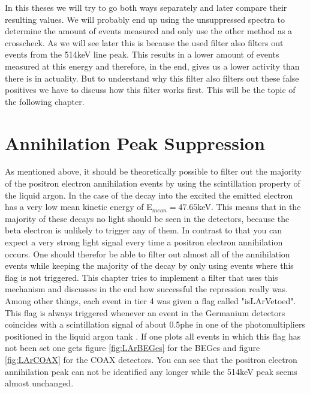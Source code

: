 In this theses we will try to go both ways separately and later compare their resulting values.
We will probably end up using the unsuppressed spectra to determine the amount of events measured and only use the other method as a crosscheck.
As we will see later this is because the used filter also filters out events from the 514keV line peak.
This results in a lower amount of events measured at this energy and therefore, in the end, gives us a lower activity than there is in actuality. 
But to understand why this filter also filters out these false positives we have to discuss how this filter works first.
This will be the topic of the following chapter.
\\

\section{Annihilation Peak Suppression}
\label{sec:APS}

As mentioned above, it should be theoretically possible to filter out the majority of the positron electron annihilation events by using the scintillation property of the liquid argon.
In the case of the \Kr decay into the excited  the emitted electron has a very low mean kinetic energy of E\(_{mean}=47.65\)keV.
This means that in the majority of these decays no light should be seen in the detectors, because the beta electron is unlikely to trigger any of them.
In contrast to that you can expect a very strong light signal every time a positron electron annihilation occurs. 
One should therefor be able to filter out almost all of the annihilation events while keeping the majority of the \Kr decay by only using events where this flag is not triggered.
This chapter tries to implement a filter that uses this mechanism and discusses in the end how successful the repression really was.
\\

Among other things, each event in tier 4 was given a flag called "isLArVetoed".
This flag is always triggered whenever an event in the Germanium detectors coincides with a scintillation signal of about 0.5phe in one of the photomultipliers positioned in the liquid argon tank \cite{agostini_allardt_bakalyarov_barabanov_baudis_bauer_bellotti_belogurov_belyaev_benato_et al._2017}.
If one plots all events in which this flag has not been set one gets figure \ref{fig:LArBEGes} for the BEGes and figure \ref{fig:LArCOAX} for the COAX detectors.
You can see that the positron electron annihilation peak can not be identified any longer while the 514keV peak seems almost unchanged.
\\

